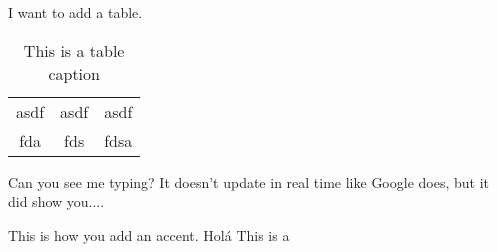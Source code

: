 
I want to add a table.
\begin{table} 
    \begin{tabular}{ c c c }
        asdf & asdf & asdf \\ 
        fda & fds & fdsa \\ 
    \end{tabular} 
    \caption{This is a table caption} 
\end{table}

Can you see me typing? It doesn't update in real time like Google does, but it did show you....

This is how you add an accent. Holá
This is a 
